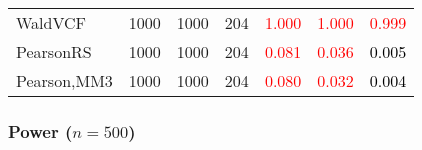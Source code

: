 \documentclass[
]{article}
\begin{document}
\begin{table}[H]
{\begin{tabular}[t]{lrrrrrr}
\hspace{1em}WaldVCF & 1000 & 1000 & 204 & \textcolor{red}{1.000} & \textcolor{red}{1.000} & \textcolor{red}{0.999}\\
\hspace{1em}PearsonRS & 1000 & 1000 & 204 & \textcolor{red}{0.081} & \textcolor{red}{0.036} & \textcolor{black}{0.005}\\
\hspace{1em}Pearson,MM3 & 1000 & 1000 & 204 & \textcolor{red}{0.080} & \textcolor{red}{0.032} & \textcolor{black}{0.004}\\
\bottomrule
\end{tabular}}
\endgroup{}
\end{table}

\hypertarget{power-n500-2}{%
\subsubsection{\texorpdfstring{Power
(\(n=500\))}{Power (n=500)}}\label{power-n500-2}}
\end{document}
